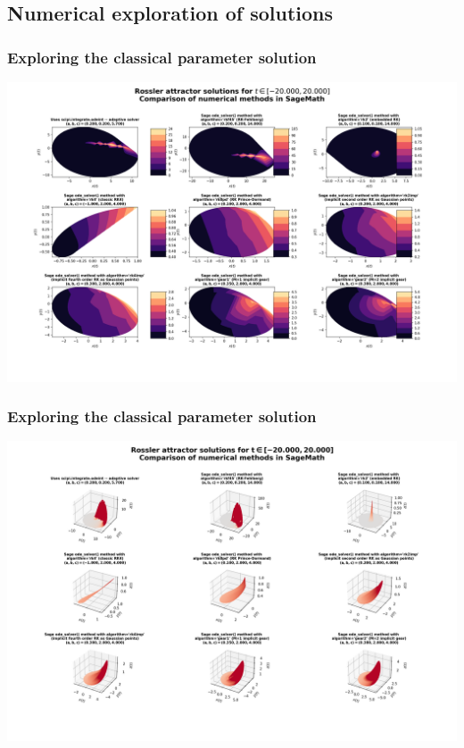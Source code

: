 \documentclass[usenames,svgnames,dvipsnames,10pt]{beamer}
\begin{document}
\subsection{Numerical exploration of solutions} 

\begin{frame}[fragile]
\frametitle{Exploring the classical parameter solution}

\begin{center}
\vskip -0.5cm
\includegraphics[height=0.92\textheight]{../Images/RosslerAttractorSage3DSolvers-2021-10-29-073902.png}
\end{center}

\end{frame}

\begin{frame}[fragile]
\frametitle{Exploring the classical parameter solution}

\begin{center}
\vskip -0.5cm
\includegraphics[height=0.92\textheight]{../Images/RosslerAttractorSage3DSolvers-2021-10-29-081641.png}
\end{center}

\end{frame}
\end{document}
